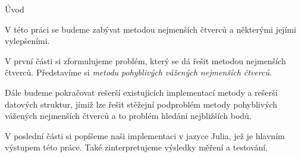 \chap Úvod

V této práci se budeme zabývat metodou nejmenších čtverců a některými jejími vylepšeními.

V první části si zformulujeme problém, který se dá řešit metodou nejmenších čtverců. Představíme si {\it metodu pohyblivých vážených nejmenších čtverců}.

Dále budeme pokračovat rešerší existujicích implementací metody a rešerší datových struktur, jímiž lze řešit stěžejní podproblém metody pohyblivých vážených nejmenších čtverců a to problém hledání nejbližších bodů.

V poslední části si popíšeme naši implementaci v jazyce Julia, jež je hlavním výstupem této práce. Také zinterpretujeme výsledky měření a testování.

